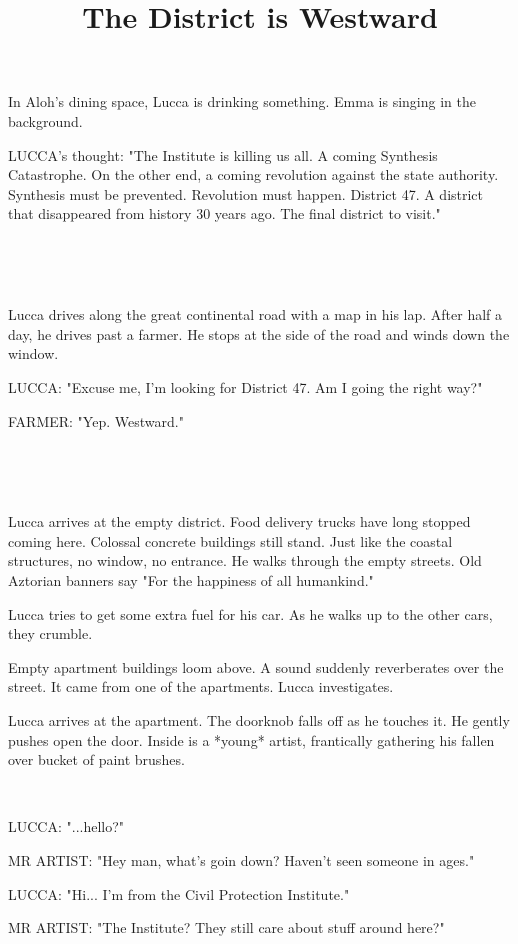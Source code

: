 \documentclass[11pt]{article}
\begin{document}
\ttfamily
\title{The District is Westward}
\maketitle

In Aloh's dining space, Lucca is drinking something.
Emma is singing in the background.

LUCCA's thought: "The Institute is killing us all.
A coming Synthesis Catastrophe.
On the other end, a coming revolution against the state authority.
Synthesis must be prevented.
Revolution must happen.
District 47. 
A district that disappeared from history 30 years ago.
The final district to visit."

\ 

\ 

Lucca drives along the great continental road with a map in his lap.
After half a day, he drives past a farmer.
He stops at the side of the road and winds down the window.

LUCCA: "Excuse me, I'm looking for District 47. 
Am I going the right way?"

FARMER: "Yep. Westward."

\ 

\ 

Lucca arrives at the empty district.
Food delivery trucks have long stopped coming here.
Colossal concrete buildings still stand.
Just like the coastal structures, no window, no entrance.
He walks through the empty streets. 
Old Aztorian banners say "For the happiness of all humankind."

Lucca tries to get some extra fuel for his car.
As he walks up to the other cars, they crumble. 

Empty apartment buildings loom above. 
A sound suddenly reverberates over the street. 
It came from one of the apartments.
Lucca investigates.

Lucca arrives at the apartment.
The doorknob falls off as he touches it.
He gently pushes open the door.
Inside is a *young* artist, frantically gathering his fallen over bucket of paint brushes. 

\ 
 
LUCCA: "...hello?"

MR ARTIST: "Hey man, what's goin down?
Haven't seen someone in ages."

LUCCA: "Hi... I'm from the Civil Protection Institute."

MR ARTIST: "The Institute? 
They still care about stuff around here?"
\end{document}
